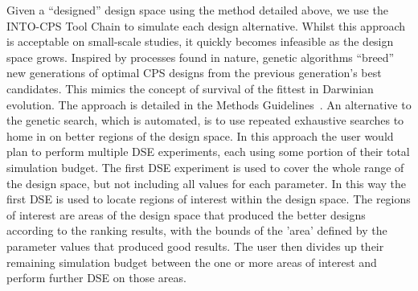 Given a ``designed'' design space using the method detailed above, we use the INTO-CPS Tool Chain to simulate each design alternative. Whilst this approach is acceptable on small-scale studies, it quickly becomes infeasible as the design space grows. Inspired by processes found in nature, genetic algorithms ``breed'' new generations of optimal CPS designs from the previous generation's best candidates. This mimics the concept of survival of the fittest in Darwinian evolution.
The approach is detailed in the Methods Guidelines~\cite{Pierce&18}. An alternative to the genetic search, which is automated, is to use repeated exhaustive searches to home in on better regions of the design space.  In this approach the user would plan to perform multiple DSE experiments, each using some portion of their total simulation budget.  The first DSE experiment is used to cover the whole range of the design space, but not including all values for each parameter.   In this way the first DSE is used to locate regions of interest within the design space.  The regions of interest are areas of the design space that produced the better designs according to the ranking results, with the bounds of the 'area' defined by the parameter values that produced good results. The user then divides up their remaining simulation budget between the one or more areas of interest and perform further DSE on those areas.
